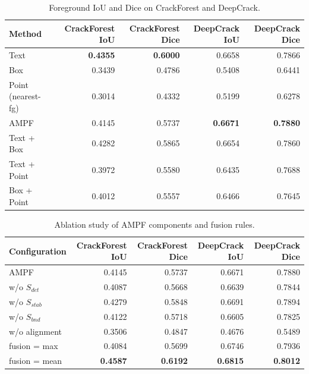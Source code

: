 \begin{table}[ht]
\centering
\caption{Foreground IoU and Dice on CrackForest and DeepCrack.}
\begin{tabular}{lrrrr}
\toprule
Method & CrackForest IoU & CrackForest Dice & DeepCrack IoU & DeepCrack Dice \\
\midrule
Text & \textbf{0.4355} & \textbf{0.6000} & 0.6658 & 0.7866 \\
Box & 0.3439 & 0.4786 & 0.5408 & 0.6441 \\
Point (nearest-fg) & 0.3014 & 0.4332 & 0.5199 & 0.6278 \\
AMPF & 0.4145 & 0.5737 & \textbf{0.6671} & \textbf{0.7880} \\
Text + Box & 0.4282 & 0.5865 & 0.6654 & 0.7860 \\
Text + Point & 0.3972 & 0.5580 & 0.6435 & 0.7688 \\
Box + Point & 0.4012 & 0.5557 & 0.6466 & 0.7645 \\
\bottomrule
\end{tabular}
\end{table}

\begin{table}[ht]
\centering
\caption{Ablation study of AMPF components and fusion rules.}
\begin{tabular}{lrrrr}
\toprule
Configuration & CrackForest IoU & CrackForest Dice & DeepCrack IoU & DeepCrack Dice \\
\midrule
AMPF & 0.4145 & 0.5737 & 0.6671 & 0.7880 \\
w/o $S_{det}$ & 0.4087 & 0.5668 & 0.6639 & 0.7844 \\
w/o $S_{stab}$ & 0.4279 & 0.5848 & 0.6691 & 0.7894 \\
w/o $S_{bnd}$ & 0.4122 & 0.5718 & 0.6605 & 0.7825 \\
w/o alignment & 0.3506 & 0.4847 & 0.4676 & 0.5489 \\
fusion = max & 0.4084 & 0.5699 & 0.6746 & 0.7936 \\
fusion = mean & \textbf{0.4587} & \textbf{0.6192} & \textbf{0.6815} & \textbf{0.8012} \\
\bottomrule
\end{tabular}
\end{table}

